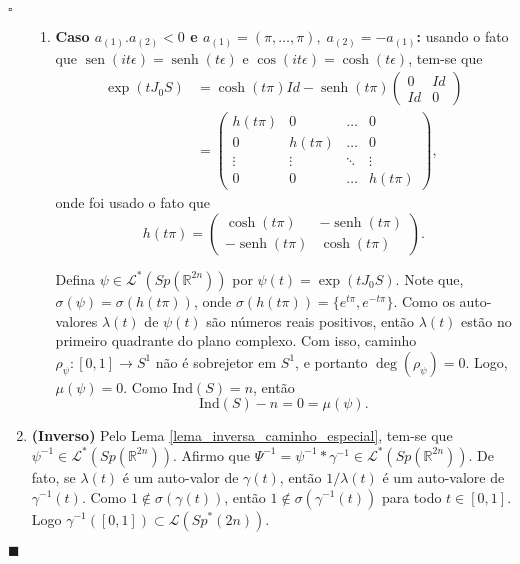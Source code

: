 \documentclass[12pt]{book}
\newenvironment{prova}[1]{$\square$ #1}{\hfill$\blacksquare$}
\DeclareMathOperator{\sen}{sen}
\DeclareMathOperator{\senh}{senh}
\newcommand{\caminhosespeciais}[1]{\mathcal{L}^{*}(#1)}
\newcommand{\caminhos}{\mathcal{L}}
\newcommand{\circulo}{S^{1}}
\newcommand{\espectrooperador}[1]{\sigma(#1)}
\newcommand{\estruturacomplexa}{J_{0}}
\newcommand{\gruposimpletico}[1]{Sp(#1)}
\newcommand{\gruposimpleticonaodegenerado}[1]{Sp^{#1}(2n)}
\newcommand{\ind}{\text{Ind}}
\newcommand{\intervalo}{[0,1]}
\newcommand{\real}[1]{\mathbb{R}^{#1}}
\begin{document}
\begin{prova}
\begin{enumerate}
\begin{enumerate}
				\item \textbf{Caso $a_{(1)}.a_{(2)}<0$ e $a_{(1)}=(\pi,\dots,\pi), \; a_{(2)} = -a_{(1)}$:} usando o fato que $\sen(it\epsilon)=\senh(t\epsilon)$ e $\cos(it\epsilon)=\cosh(t\epsilon)$, tem-se que
				$$
				\begin{aligned}
					\exp(t\estruturacomplexa S) 
					&= \cosh(t\pi)Id- \senh(t\pi)\left(
					\begin{array}{cc}
					0 & Id
					\\
					Id & 0  
					\end{array}
					\right)
					\\
					&=	
					\left(
					\begin{array}{ccccc}
					h(t\pi) & 0 &\dots & 0 
					\\
					0 & h(t\pi) &\dots & 0 
					\\
					\vdots & \vdots & \ddots & \vdots 
					\\
					0 & 0 & \dots & h(t\pi)
					\end{array}
					\right),
				\end{aligned}
				$$
				onde foi usado o fato que 
				$$
				h(t\pi) = 
				\left(
				\begin{array}{cc}
				\cosh(t\pi) & -\senh(t\pi)
				\\
				-\senh(t\pi) & \cosh(t\pi)
				\end{array}
				\right).
				$$
				
				Defina $\psi \in \caminhosespeciais{\gruposimpletico{\real{2n}}}$ por $\psi(t) = \exp(t\estruturacomplexa S)$. Note que, $\espectrooperador{\psi}= \espectrooperador{h(t\pi)} $, onde $\espectrooperador{h(t\pi)} = \{e^{t\pi} , e^{-t\pi}\}$. Como os auto-valores $\lambda(t)$ de $\psi(t)$ são números reais positivos, então $\lambda(t)$ estão no primeiro quadrante do plano complexo. Com isso, caminho $\rho_{\psi}:\intervalo\to \circulo$ não é sobrejetor em $\circulo$, e portanto $\deg(\rho_{\psi}) = 0$. Logo, $\mu(\psi) = 0$. Como $\ind(S) = n$, então
				$$
				\ind(S) - n = 0 =\mu(\psi).
				$$
			
			\end{enumerate}
	
			\item \textbf{(Inverso)} Pelo Lema \ref{lema_inversa_caminho_especial}, tem-se que $\psi^{-1} \in \caminhosespeciais{\gruposimpletico{\real{2n}}}$. Afirmo que $\Psi^{-1}= \psi^{-1}*\gamma^{-1} \in \caminhosespeciais{\gruposimpletico{\real{2n}}}$. De fato, se $\lambda(t)$ é um auto-valor de $\gamma(t)$, então $1/\lambda(t)$ é um auto-valore de $\gamma^{-1}(t)$. Como $1 \notin\espectrooperador{\gamma(t)}$, então $1 \notin\espectrooperador{\gamma^{-1}(t)}$
			para todo $t\in \intervalo$. Logo $\gamma^{-1}(\intervalo)\subset\caminhos(\gruposimpleticonaodegenerado{*})$. 
			

\end{enumerate}
\end{prova}
\end{document}

